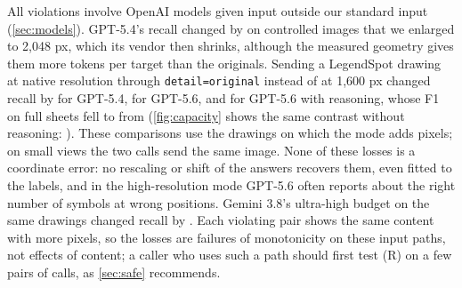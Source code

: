 All \XtcViol{} violations involve OpenAI models given input outside our standard input (\cref{sec:models}). GPT-5.4's recall changed by \XtcViolD{} \XtcViolCI{} on controlled images that we enlarged to 2{,}048 px, which its vendor then shrinks, although the measured geometry gives them more tokens per target than the originals. Sending a LegendSpot drawing at native resolution through \texttt{detail=original} instead of at 1{,}600 px changed recall by \XtcVendGptFiveFour{} \XtcVendCIGptFiveFour{} for GPT-5.4, \XtcVendGptFiveSix{} \XtcVendCIGptFiveSix{} for GPT-5.6, and \XtcVendGptFiveSixR{} \XtcVendCIGptFiveSixR{} for GPT-5.6 with reasoning, whose F1 on full sheets fell to \XnFNATRgptFiveSixSheets{} from \XnFAOneRgptFiveSixSheets{} (\cref{fig:capacity} shows the same contrast without reasoning: \CcapnativeMinusautosheets{} \CcapnativeMinusautosheetsCI). These comparisons use the \XtcVendNGptFiveFour{} drawings on which the mode adds pixels; on small views the two calls send the same image. None of these losses is a coordinate error: no rescaling or shift of the answers recovers them, even fitted to the labels, and in the high-resolution mode GPT-5.6 often reports about the right number of symbols at wrong positions. Gemini 3.8's ultra-high budget on the same drawings changed recall by \XtcVendGemThreeEight{} \XtcVendCIGemThreeEight. Each violating pair shows the same content with more pixels, so the losses are failures of monotonicity on these input paths, not effects of content; a caller who uses such a path should first test (R) on a few pairs of calls, as \cref{sec:safe} recommends.
